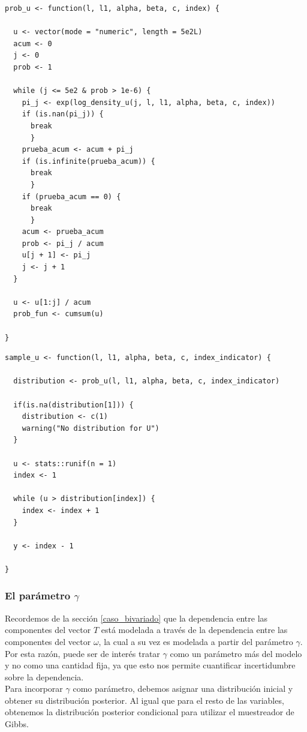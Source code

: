 \documentclass[11pt,a4paper]{article}
\begin{document}
\begin{lstlisting}
prob_u <- function(l, l1, alpha, beta, c, index) {

  u <- vector(mode = "numeric", length = 5e2L)
  acum <- 0
  j <- 0
  prob <- 1

  while (j <= 5e2 & prob > 1e-6) {
    pi_j <- exp(log_density_u(j, l, l1, alpha, beta, c, index))
    if (is.nan(pi_j)) {
      break
      }
    prueba_acum <- acum + pi_j
    if (is.infinite(prueba_acum)) {
      break
      }
    if (prueba_acum == 0) {
      break
      }
    acum <- prueba_acum
    prob <- pi_j / acum
    u[j + 1] <- pi_j
    j <- j + 1
  }

  u <- u[1:j] / acum
  prob_fun <- cumsum(u)

}
\end{lstlisting}

\begin{lstlisting}
sample_u <- function(l, l1, alpha, beta, c, index_indicator) {

  distribution <- prob_u(l, l1, alpha, beta, c, index_indicator)

  if(is.na(distribution[1])) {
    distribution <- c(1)
    warning("No distribution for U")
  }

  u <- stats::runif(n = 1)
  index <- 1

  while (u > distribution[index]) {
    index <- index + 1
  }

  y <- index - 1

}
\end{lstlisting}

\subsubsection{El parámetro $\gamma$}

Recordemos de la sección \ref{caso_bivariado} que la dependencia entre las componentes del vector $T$ está modelada a través de la dependencia entre las componentes del vector $\omega$, la cual a su vez es modelada a partir del parámetro $\gamma$. Por esta razón, puede ser de interés tratar $\gamma$ como un parámetro más del modelo y no como una cantidad fija, ya que esto nos permite cuantificar incertidumbre sobre la dependencia.\\

Para incorporar $\gamma$ como parámetro, debemos asignar una distribución inicial y obtener su distribución posterior. Al igual que para el resto de las variables, obtenemos la distribución posterior condicional para utilizar el muestreador de Gibbs.\\
\end{document}
